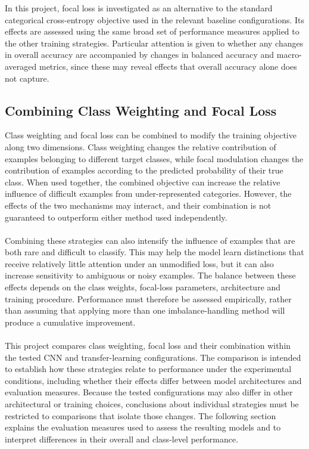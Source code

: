 \documentclass[12pt, a4paper]{report}
\let\oldsubsection\subsection
\renewcommand{\subsection}{%
    \Needspace{6\baselineskip}%
    \oldsubsection
}
\begin{document}
				In this project, focal loss is investigated as an alternative to the standard categorical cross-entropy objective used in the relevant baseline configurations. Its effects are assessed using the same broad set of performance measures applied to the other training strategies. Particular attention is given to whether any changes in overall accuracy are accompanied by changes in balanced accuracy and macro-averaged metrics, since these may reveal effects that overall accuracy alone does not capture.
				
			\subsection{Combining Class Weighting and Focal Loss}
				
				Class weighting and focal loss can be combined to modify the training objective along two dimensions. Class weighting changes the relative contribution of examples belonging to different target classes, while focal modulation changes the contribution of examples according to the predicted probability of their true class. When used together, the combined objective can increase the relative influence of difficult examples from under-represented categories. However, the effects of the two mechanisms may interact, and their combination is not guaranteed to outperform either method used independently.\\\\
				Combining these strategies can also intensify the influence of examples that are both rare and difficult to classify. This may help the model learn distinctions that receive relatively little attention under an unmodified loss, but it can also increase sensitivity to ambiguous or noisy examples. The balance between these effects depends on the class weights, focal-loss parameters, architecture and training procedure. Performance must therefore be assessed empirically, rather than assuming that applying more than one imbalance-handling method will produce a cumulative improvement.\\\\
				This project compares class weighting, focal loss and their combination within the tested CNN and transfer-learning configurations. The comparison is intended to establish how these strategies relate to performance under the experimental conditions, including whether their effects differ between model architectures and evaluation measures. Because the tested configurations may also differ in other architectural or training choices, conclusions about individual strategies must be restricted to comparisons that isolate those changes. The following section explains the evaluation measures used to assess the resulting models and to interpret differences in their overall and class-level performance.
				
\end{document}
